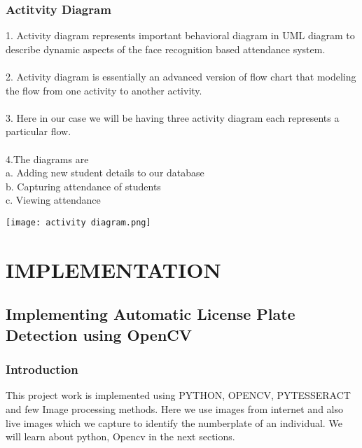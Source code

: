\documentclass[12pt,a4paper]{report}
\begin{document}
\subsection{\large Actitvity Diagram}
1. Activity diagram represents important behavioral diagram in UML diagram to describe dynamic aspects of the face recognition based attendance system.\\ \\
2. Activity diagram is essentially an advanced version of flow chart that modeling the flow from one activity to another activity.\\ \\
3. Here in our case we will be having three activity diagram each represents a particular flow.\\ \\
4.The diagrams are \\
 \hspace*{0.5cm}
 a. Adding new student details to our database\\
 \hspace*{0.5cm}
 b. Capturing attendance of students\\
 \hspace*{0.5cm}
 c. Viewing attendance\\
\begin{center}
\texttt{[image: activity diagram.png]}
\begin{figure}[h!]
\caption{}
\end{figure}
\end{center}

\chapter{IMPLEMENTATION}
\section{Implementing Automatic License Plate Detection using OpenCV}

\subsection{Introduction}
This project work is implemented using PYTHON, OPENCV, PYTESSERACT and few Image processing methods. Here we use images from internet and also live images which we capture to identify the numberplate of an individual. We will learn about python, Opencv in the next sections.
\end{document}
